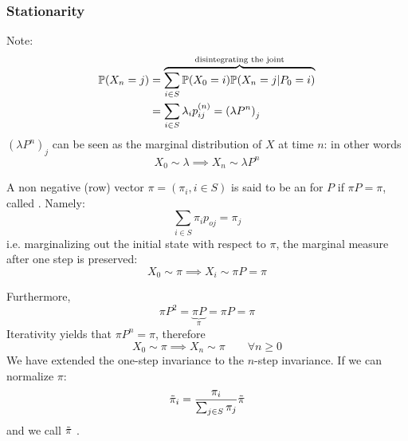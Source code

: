 \documentclass{article}
\begin{document}
	\subsubsection{Stationarity}
	Note:
	\begin{align*}
		\prob(X_n=j) &= \overbrace{\sum_{i\in S}\prob(X_0=i)\prob(X_n=j|P_0=i) }^{\mathclap{\text{disintegrating the joint}}}\\
		&=\sum_{i\in S}\lambda_i p_{ij}^{(n)}=\left(\lambda P^n\right)_j
	\end{align*}
	$\left(\lambda P^n\right)_j$ can be seen as the marginal distribution of $X$ at time $n$: in other words
	\[X_0\sim \lambda\implies X_n\sim\lambda P^n\]
	
	\begin{definition}
		A non negative (row) vector $\pi=(\pi_i, i\in S)$ is said to be an  for $P$ if $\pi P=\pi$, called . Namely:
		\[\sum_{i \in S} \pi_i p_{oj}=\pi_j \]
		i.e. marginalizing out the initial state with respect to $\pi$, the marginal measure after one step is preserved:
		\[
		X_0 \sim \pi \implies X_i \sim \pi P = \pi
		\]
	\end{definition}
	Furthermore,
	\[
	\pi P^2=\underbrace{\pi P}_{\pi}=\pi P= \pi
	\]
	Iterativity yields that $\pi P^n=\pi$, therefore
	\[
	X_0\sim \pi \implies X_n\sim\pi \qquad \forall n \geqslant 0
	\]
	We have extended the one-step invariance to the $n$-step invariance. If we can normalize $\pi$:
	\[
	\Tilde{\pi}_i=\frac{\pi_i}{\sum_{j\in S}\pi_j}\Tilde{\pi}\]
	and we call $\Tilde{\pi}$ .
\end{document}

